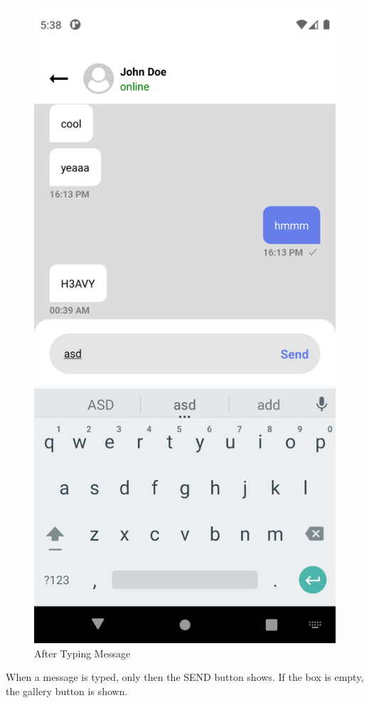 \begin{figure}[!htb]
\begin{minipage}{0.48\textwidth}
		\includegraphics[width=0.8\linewidth]{figures/Testing/chat2.png}
		\caption{After Typing Message}\label{Fig:Data2}
	\end{minipage}
\end{figure}
When a message is typed, only then the SEND button shows. If the box is empty, the gallery button is shown.
\newpage

